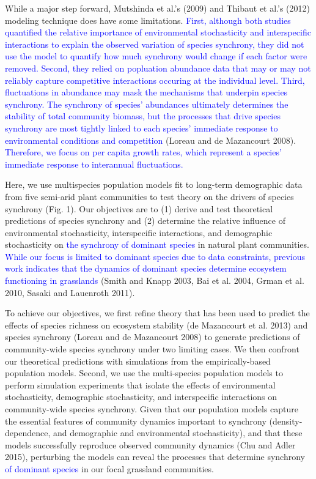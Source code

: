 \documentclass[12pt,]{article}
\begin{document}
While a major step forward, Mutshinda et al.'s (2009) and Thibaut et
al.'s (2012) modeling technique does have some limitations.
\textcolor{blue}{First, although both studies quantified the relative importance of environmental stochasticity and interspecific interactions to explain the observed variation of species synchrony, they did not use the model to quantify how much synchrony would change if each factor were removed.
Second, they relied on popluation abundance data that may or may not reliably capture competitive interactions occuring at the individual level.
Third, fluctuations in abundance may mask the mechanisms that underpin species synchrony.
The synchrony of species' abundances ultimately determines the stability of total community biomass, but the processes that drive species synchrony are most tightly linked to each species' immediate response to environmental conditions and competition}
(Loreau and {{de Mazancourt}} 2008).
\textcolor{blue}{Therefore, we focus on per capita growth rates, which represent a species' immediate response to interannual fluctuations.}

Here, we use multispecies population models fit to long-term demographic
data from five semi-arid plant communities to test theory on the drivers
of species synchrony (Fig. 1). Our objectives are to (1) derive and test
theoretical predictions of species synchrony and (2) determine the
relative influence of environmental stochasticity, interspecific
interactions, and demographic stochasticity on
\textcolor{blue}{the synchrony of dominant species} in natural plant
communities.
\textcolor{blue}{While our focus is limited to dominant species due to data constraints, previous work indicates that the dynamics of dominant species determine ecosystem functioning in grasslands}
(Smith and Knapp 2003, Bai et al. 2004, Grman et al. 2010, Sasaki and
Lauenroth 2011).

To achieve our objectives, we first refine theory that has been used to
predict the effects of species richness on ecosystem stability ({{de
Mazancourt}} et al. 2013) and species synchrony (Loreau and {{de
Mazancourt}} 2008) to generate predictions of community-wide species
synchrony under two limiting cases. We then confront our theoretical
predictions with simulations from the empirically-based population
models. Second, we use the multi-species population models to perform
simulation experiments that isolate the effects of environmental
stochasticity, demographic stochasticity, and interspecific interactions
on community-wide species synchrony. Given that our population models
capture the essential features of community dynamics important to
synchrony (density-dependence, and demographic and environmental
stochasticity), and that these models successfully reproduce observed
community dynamics (Chu and Adler 2015), perturbing the models can
reveal the processes that determine synchrony
\textcolor{blue}{of dominant species} in our focal grassland
communities.
\end{document}
